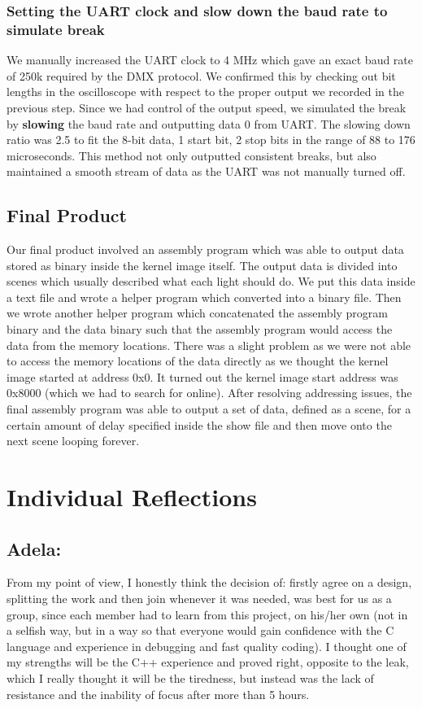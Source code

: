 \documentclass[11pt,a4paper]{article}
\begin{document}
\subsubsection{Setting the UART clock and slow down the baud rate to simulate break}
We manually increased the UART clock to 4 MHz which gave an exact baud rate of 250k required by the DMX protocol. We confirmed this by checking out bit lengths in the oscilloscope with respect to the proper output we recorded in the previous step. Since we had control of the output speed, we simulated the break by \textbf{slowing} the baud rate and outputting data 0 from UART. The slowing down ratio was 2.5 to fit the 8-bit data, 1 start bit, 2 stop bits in the range of 88 to 176 microseconds. This method not only outputted consistent breaks, but also maintained a smooth stream of data as the UART was not manually turned off.

\subsection{Final Product}
Our final product involved an assembly program which was able to output data stored as binary inside the kernel image itself. The output data is divided into scenes which usually described what each light should do. We put this data inside a text file and wrote a helper program which converted into a binary file. Then we wrote another helper program which concatenated the assembly program binary and the data binary such that the assembly program would access the data from the memory locations. There was a slight problem as we were not able to access the memory locations of the data directly as we thought the kernel image started at address 0x0. It turned out the kernel image start address was 0x8000 (which we had to search for online). After resolving addressing issues, the final assembly program was able to output a set of data, defined as a scene, for a certain amount of delay specified inside the show file and then move onto the next scene looping forever.

\section{Individual Reflections}

\subsection{Adela:}
From my point of view, I honestly think the decision of: firstly agree on a design, splitting the work and then join whenever it was needed, was best for us as a group, since each member had to learn from this project, on his/her own (not in a selfish way, but in a way so that everyone would gain confidence with the C language and experience in debugging and fast quality coding). 
      I thought one of my strengths will be the C++ experience and proved right, opposite to the leak, which I really thought it will be the tiredness, but instead was the lack of resistance and the inability of focus after more than 5 hours. 
      
\end{document}
